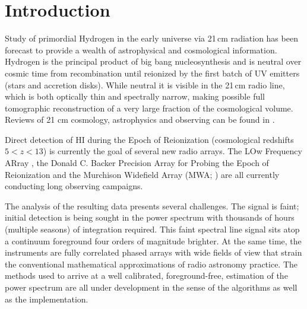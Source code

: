\documentclass[twolcolumn,iop]{emulateapj}
\begin{document}





\section{Introduction} 
  Study of primordial Hydrogen  in the early universe via 21\,cm radiation has been forecast to provide a wealth of astrophysical and cosmological information.   Hydrogen is the principal product of big bang nucleosynthesis and is neutral over cosmic time from recombination until reionized by the first batch of UV emitters (stars and accretion disks). While neutral it is visible in the 21\,cm radio line, which is both optically thin and spectrally narrow, making possible full tomographic reconstruction of a very large fraction of the cosmological volume.  Reviews of 21 cm cosmology, astrophysics and observing can be found in \cite{Morales:2010p8093,Furlanetto:2006p2267,Pritchard:2012p9555,zaroubi2013epoch}.
  
Direct detection of HI during the Epoch of Reionization (cosmological redshifts $5<z<13$) is currently the goal of several new radio arrays. The LOw Frequency ARray \citep[LOFAR;][]{Yatawatta:2013p9699}, the Donald C. Backer Precision Array for Probing the Epoch of Reionization \citep[PAPER][]{Parsons:2014p10499} and the Murchison Widefield Array (MWA; \cite{Tingay:2013p9022,Bowman:2013p9950}) are all currently conducting long observing campaigns.



The analysis of the resulting data presents several challenges. The signal is faint; initial detection is being sought in the power spectrum with thousands of hours (multiple seasons) of integration required. This faint spectral line signal sits atop a continuum foreground four orders of magnitude brighter. At the same time, the instruments are fully correlated phased arrays with wide fields of view that strain the conventional mathematical approximations of radio astronomy practice. The methods used to arrive at a well calibrated, foreground-free, estimation of the power spectrum are all under development in the sense of the algorithms as well as the implementation.  
\end{document}
